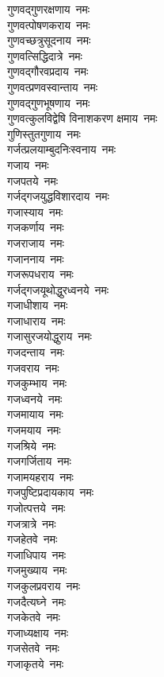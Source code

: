 \begin{multicols}{2}
\begin{flushleft}
गुणवद्गुणरक्षणाय~नमः\\
गुणवत्पोषणकराय~नमः\\
गुणवच्छत्रुसूदनाय~नमः\\
गुणवत्सिद्धिदात्रे~नमः\hfill{}\\
गुणवद्गौरवप्रदाय~नमः\\
गुणवत्प्रणवस्वान्ताय~नमः\\
गुणवद्गुणभूषणाय~नमः\\
गुणवत्कुलविद्वेषि विनाशकरण क्षमाय~नमः\\
गुणिस्तुतगुणाय~नमः\\
गर्जत्प्रलयाम्बुद\-निःस्वनाय~नमः\\
गजाय~नमः\\
गजपतये~नमः\\
गर्जद्गजयुद्धविशारदाय~नमः\\
गजास्याय~नमः\hfill{}\\
गजकर्णाय~नमः\\
गजराजाय~नमः\\
गजाननाय~नमः\\
गजरूपधराय~नमः\\
गर्जद्गजयूथोद्धुरध्वनये~नमः\\
गजाधीशाय~नमः\\
गजाधाराय~नमः\\
गजासुरजयोद्धुराय~नमः\\
गजदन्ताय~नमः\\
गजवराय~नमः\hfill{}\\
गजकुम्भाय~नमः\\
गजध्वनये~नमः\\
गजमायाय~नमः\\
गजमयाय~नमः\\
गजश्रिये~नमः\\
गजगर्जिताय~नमः\\
गजामयहराय~नमः\\
गजपुष्टिप्रदायकाय~नमः\\
गजोत्पत्तये~नमः\\
गजत्रात्रे~नमः\hfill{}\\
गजहेतवे~नमः\\
गजाधिपाय~नमः\\
गजमुख्याय~नमः\\
गजकुलप्रवराय~नमः\\
गजदैत्यघ्ने~नमः\\
गजकेतवे~नमः\\
गजाध्यक्षाय~नमः\\
गजसेतवे~नमः\\
गजाकृतये~नमः\\

\end{flushleft}
\end{multicols}
